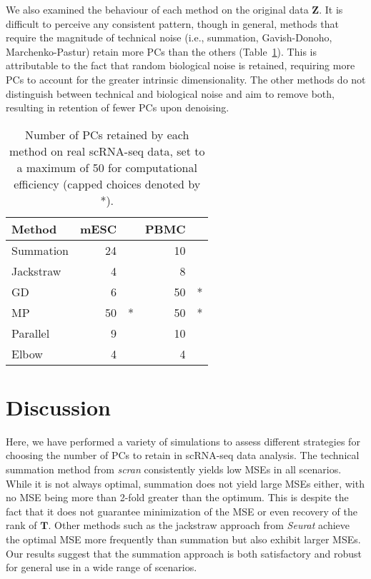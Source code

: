 \documentclass[10pt,letterpaper]{article}
\begin{document}
We also examined the behaviour of each method on the original data $\mathbf{Z}$.
It is difficult to perceive any consistent pattern, though in general, 
methods that require the magnitude of technical noise (i.e., summation, Gavish-Donoho, Marchenko-Pastur) retain more PCs than the others (Table~\ref{tab:real}).
This is attributable to the fact that random biological noise is retained, requiring more PCs to account for the greater intrinsic dimensionality.
The other methods do not distinguish between technical and biological noise and aim to remove both, resulting in retention of fewer PCs upon denoising.

\begin{table}[btp]
\caption{Number of PCs retained by each method on real scRNA-seq data, set to a maximum of 50 for computational efficiency (capped choices denoted by *).}
\label{tab:real}
\begin{center}
\begin{tabular}{l r@{}l r@{}l}
\hline
\textbf{Method} & \textbf{mESC} & & \textbf{PBMC} \\
\hline
Summation & 24 & & 10 & \\
Jackstraw & 4 & & 8 & \\
GD & 6 & & 50 & * \\
MP & 50 &* & 50 & * \\
Parallel & 9 & & 10 & \\
Elbow & 4 & & 4  & \\
\hline
\end{tabular}
\end{center}
\end{table}

\section{Discussion}
Here, we have performed a variety of simulations to assess different strategies for choosing the number of PCs to retain in scRNA-seq data analysis.
The technical summation method from \textit{scran} consistently yields low MSEs in all scenarios.
While it is not always optimal, summation does not yield large MSEs either, with no MSE being more than 2-fold greater than the optimum.
This is despite the fact that it does not guarantee minimization of the MSE or even recovery of the rank of $\mathbf{T}$.
Other methods such as the jackstraw approach from \textit{Seurat} achieve the optimal MSE more frequently than summation but also exhibit larger MSEs.
Our results suggest that the summation approach is both satisfactory and robust for general use in a wide range of scenarios.
\end{document}
